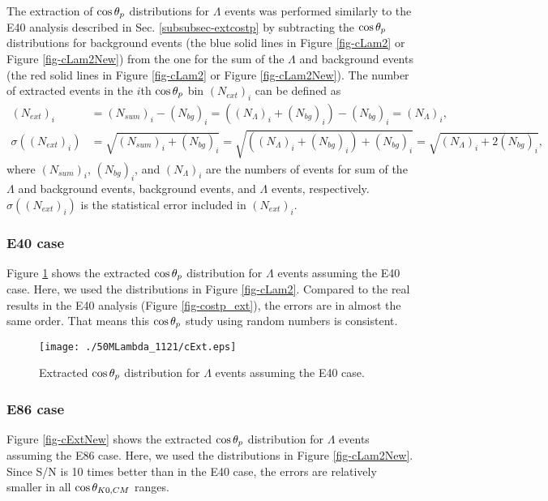 The extraction of $\cos{\theta_p}$ distributions for $\Lambda$ events was performed similarly to the E40 analysis described in Sec. \ref{subsubsec-extcostp} by subtracting the $\cos{\theta_p}$ distributions for background events (the blue solid lines in Figure \ref{fig-cLam2} or Figure \ref{fig-cLam2New}) from the one for the sum of the $\Lambda$ and background events (the red solid lines in Figure \ref{fig-cLam2} or Figure \ref{fig-cLam2New}). The number of extracted events in the $i$th $\cos{\theta_p}$ bin $(N_{ext})_i$ can be defined as 
\begin{align}
  (N_{ext})_i &= (N_{sum})_i - (N_{bg})_i = ((N_{\Lambda})_i + (N_{bg})_i) - (N_{bg})_i = (N_{\Lambda})_i, \\
  \sigma((N_{ext})_i) &= \sqrt{(N_{sum})_i + (N_{bg})_i} = \sqrt{((N_{\Lambda})_i + (N_{bg})_i) + (N_{bg})_i} = \sqrt{(N_{\Lambda})_i + 2(N_{bg})_i},
\end{align}
where $(N_{sum})_i$, $(N_{bg})_i$, and $(N_{\Lambda})_i$ are the numbers of events for sum of the $\Lambda$ and background events, background events, and $\Lambda$ events, respectively. $\sigma((N_{ext})_i)$ is the statistical error included in $(N_{ext})_i$.

\subsubsection{E40 case}
\label{subsubsec-randexte40}

Figure \ref{fig-cExt} shows the extracted $\cos{\theta_p}$ distribution for $\Lambda$ events assuming the E40 case. Here, we used the distributions in Figure \ref{fig-cLam2}. Compared to the real results in the E40 analysis (Figure \ref{fig-costp_ext}), the errors are in almost the same order. That means this $\cos{\theta_p}$ study using random numbers is consistent.

\begin{figure}[h]
  \centering
  \texttt{[image: ./50MLambda\_1121/cExt.eps]}
  \caption{Extracted $\cos{\theta_p}$ distribution for $\Lambda$ events assuming the E40 case.}
  \label{fig-cExt}
\end{figure}


\subsubsection{E86 case}
\label{subsubsec-randexte86}

Figure \ref{fig-cExtNew} shows the extracted $\cos{\theta_p}$ distribution for $\Lambda$ events assuming the E86 case. Here, we used the distributions in Figure \ref{fig-cLam2New}. Since S/N is 10 times better than in the E40 case, the errors are relatively smaller in all $\cos{\theta_{K0,CM}}$ ranges.

